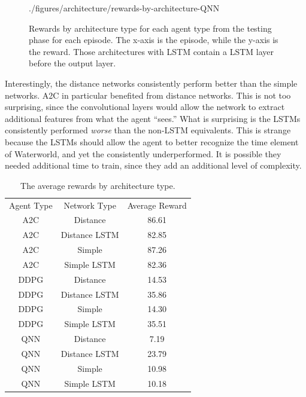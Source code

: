\begin{figure}[!ht]
    {./figures/architecture/rewards-by-architecture-QNN}
    \caption{
        Rewards by architecture type for each agent type from the testing phase for
        each episode.
        The x-axis is the episode, while the y-axis is the reward.
        Those architectures with LSTM contain a LSTM layer before the output layer.
    }
    \label{fig:rewards-by-architecture}
\end{figure}

Interestingly, the distance networks consistently perform better than the simple
networks.
A2C in particular benefited from distance networks.
This is not too surprising, since the convolutional layers would allow the network to
extract additional features from what the agent ``sees.''
What is surprising is the LSTMs consistently performed \textit{worse} than the
non-LSTM equivalents.
This is strange because the LSTMs should allow the agent to better recognize the time
element of Waterworld, and yet the consistently underperformed.
It is possible they needed additional time to train, since they add an additional
level of complexity.

\begin{table}[!htbp]
    \renewcommand{\arraystretch}{1.3}

    \caption{The average rewards by architecture type.}
    \label{tab:architecture-average-reward}

    \centering
    \begin{tabular}{|c|c|c|}
        \hline
        Agent Type & Network Type       & Average Reward \\
        \hhline{|=|=|=|}
        A2C & Distance       & 86.61          \\
        \hline
        A2C & Distance LSTM  & 82.85          \\
        \hline
        A2C & Simple         & 87.26          \\
        \hline
        A2C & Simple LSTM    & 82.36          \\
        \hline
        DDPG & Distance      & 14.53          \\
        \hline
        DDPG & Distance LSTM & 35.86          \\
        \hline
        DDPG & Simple        & 14.30          \\
        \hline
        DDPG & Simple LSTM   & 35.51          \\
        \hline
        QNN & Distance       & 7.19           \\
        \hline
        QNN & Distance LSTM  & 23.79          \\
        \hline
        QNN & Simple         & 10.98          \\
        \hline
        QNN & Simple LSTM    & 10.18          \\
        \hline
    \end{tabular}
\end{table}

